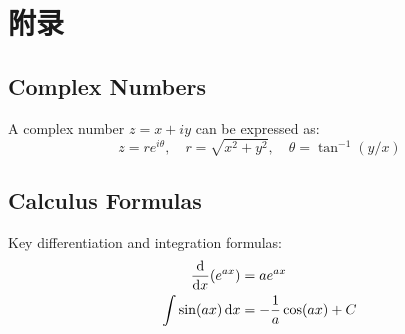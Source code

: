 \chapter*{附录}
\section{Complex Numbers}
A complex number $z = x + iy$ can be expressed as:
\begin{equation}
	z = re^{i\theta}, \quad r = \sqrt{x^2 + y^2}, \quad \theta = \tan^{-1}(y/x)
\end{equation}

\section{Calculus Formulas}
Key differentiation and integration formulas:
\begin{align}
	\dv{x}(e^{ax}) &= ae^{ax} \\
	\int \sin(ax) \dd{x} &= -\frac{1}{a} \cos(ax) + C
\end{align}